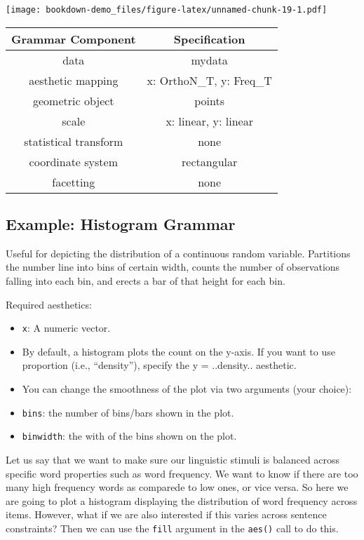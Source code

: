 \documentclass[]{book}
\begin{document}
\texttt{[image: bookdown-demo\_files/figure-latex/unnamed-chunk-19-1.pdf]}

\begin{longtable}[]{@{}cc@{}}
\toprule
Grammar Component & Specification\tabularnewline
\midrule
\endhead
data & mydata\tabularnewline
aesthetic mapping & x: OrthoN\_T, y: Freq\_T\tabularnewline
geometric object & points\tabularnewline
scale & x: linear, y: linear\tabularnewline
statistical transform & none\tabularnewline
coordinate system & rectangular\tabularnewline
facetting & none\tabularnewline
\bottomrule
\end{longtable}

\subsection{Example: Histogram Grammar}\label{example-histogram-grammar}

Useful for depicting the distribution of a continuous random variable.
Partitions the number line into bins of certain width, counts the number
of observations falling into each bin, and erects a bar of that height
for each bin.

Required aesthetics:

\begin{itemize}
\item
  \texttt{x}: A numeric vector.
\item
  By default, a histogram plots the count on the y-axis. If you want to
  use proportion (i.e., ``density''), specify the y = ..density..
  aesthetic.
\item
  You can change the smoothness of the plot via two arguments (your
  choice):
\item
  \texttt{bins}: the number of bins/bars shown in the plot.
\item
  \texttt{binwidth}: the with of the bins shown on the plot.
\end{itemize}

Let us say that we want to make sure our linguistic stimuli is balanced
across specific word properties such as word frequency. We want to know
if there are too many high frequency words as comparede to low ones, or
vice versa. So here we are going to plot a histogram displaying the
distribution of word frequency across items. However, what if we are
also interested if this varies across sentence constraints? Then we can
use the \texttt{fill} argument in the \texttt{aes()} call to do this.
\end{document}
